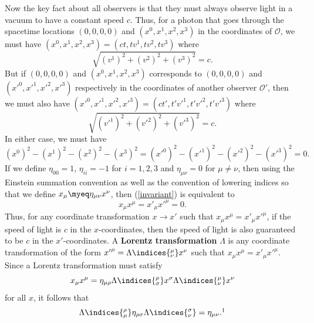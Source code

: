 \documentclass[12pt]{report}
\begin{document}
Now the key fact about all observers is that they must always observe light in a vacuum to have a constant speed $c$. Thus,  for a photon that goes through the spacetime locations $(0,0,0,0)$ and $(x^0, x^1, x^2, x^3)$ in the coordinates of $\mathcal{O}$, we must have $(x^0, x^1, x^2, x^3)=(ct,tv^1,tv^2,tv^3)$ where 
$$\sqrt{(v^1)^2 +(v^2)^2+(v^3)^2}=c.$$ But if $(0,0,0,0)$ and $(x^0, x^1, x^2, x^3)$ corresponds to $(0,0,0,0)$ and $({x'}^0, {x'}^1, {x'}^2, {x'}^3)$ respectively in the coordinates of another observer $\mathcal{O}'$, then we must also have $({x'}^0, {x'}^1, {x'}^2, {x'}^3)=(ct',t'{v'}^1,t'{v'}^2,t'{v'}^3)$ where 
$$\sqrt{({v'}^1)^2 +({v'}^2)^2+({v'}^3)^2}=c.$$ 
In either case, we must have 
\begin{equation}\label{invariant}
(x^0)^2- (x^1)^2- (x^2)^2 - (x^3)^2=({x'}^0)^2- ({x'}^1)^2- ({x'}^2)^2 - ({x'}^3)^2=0.
\end{equation}
If we define $\eta_{00}=1$, $\eta_{ii}=-1$ for $i=1,2,3$ and $\eta_{\mu\nu}=0$ %
%
 for $\mu\neq\nu$, then using the Einstein summation convention as well as the convention of lowering indices so that we define $x_\mu\myeq\eta_{\mu\nu}x^\nu$, %
  then (\ref{invariant}) is equivalent to 
$$x_\mu x^\mu={x'}_\mu {x'}^\mu=0.$$ 
Thus, for any coordinate transformation $x\rightarrow x'$ such that  $x_\mu x^\mu={x'}_\mu{x'}^\mu$,  if the speed of light is $c$ in the $x$-coordinates, then the speed of light is also guaranteed to be $c$ in the $x'$-coordinates.  A \textbf{Lorentz transformation} $\Lambda$ %
%
 is any coordinate  %
 transformation of the form ${x'}^\mu=\Lambda\indices{^\mu_\nu}x^\nu$\label{coordtansformation} such that $x_\mu x^\mu={x'}_\mu{x'}^\mu$. Since a Lorentz transformation must satisfy
$$x_\mu x^\mu=\eta_{\mu\rho}\Lambda\indices{^\rho_\sigma}x^\sigma\Lambda\indices{^\mu_\nu}x^\nu$$
for all $x$, it follows that  
\begin{equation}\label{lorentztrans}
\Lambda\indices{^\rho_\mu}\eta_{\rho\sigma}\Lambda\indices{^\sigma_\nu}=\eta_{\mu\nu}.\protect\footnotemark
\end{equation}
\end{document}
